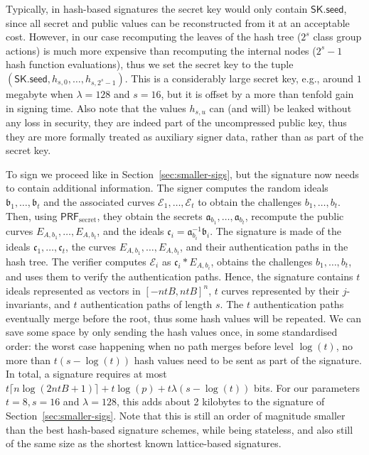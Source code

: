 \documentclass{llncs}
\newcommand{\E}{\mathcal{E}}
\newcommand{\seed}{\mathsf{seed}}
\newcommand{\SK}{\mathsf{SK}}
\renewcommand{\a}{\mathfrak{a}}
\renewcommand{\b}{\mathfrak{b}}
\renewcommand{\c}{\mathfrak{c}}
\newcommand{\PRF}{\mathsf{PRF}}
\newcommand{\PRFs}{\PRF_{\mathrm{secret}}}
\begin{document}
Typically, in hash-based signatures the secret key would only contain $\SK.\seed$, since all secret and public values can be reconstructed from it at an acceptable cost.
However, in our case recomputing the leaves of the hash tree ($2^s$ class group actions) is much more expensive than recomputing the internal nodes ($2^s-1$ hash function evaluations), thus we set the secret key to the tuple $(\SK.\seed,h_{s,0},\dots,h_{s,2^s-1})$.
This is a considerably large secret key, e.g., around $1$ megabyte when $\lambda=128$ and $s=16$, but it is offset by a more than tenfold gain in signing time.
Also note that the values $h_{s,u}$ can (and will) be leaked without any loss in security, they are indeed part of the uncompressed public key, thus they are more formally treated as auxiliary signer data, rather than as part of the secret key.

To sign we proceed like in Section~\ref{sec:smaller-sigs}, but the signature now needs to contain additional information.
The signer computes the random ideals $\b_1,\dots,\b_t$ and the associated curves $\E_1,\dots,\E_t$ to obtain the challenges $b_1,\dots,b_t$.
Then, using $\PRFs$, they obtain the secrets $\a_{b_1},\dots,\a_{b_t}$, recompute the public curves $E_{A,b_1},\dots,E_{A,b_t}$, and the ideals $\c_i=\a_{b_i}^{-1}\b_i$.
The signature is made of the ideals $\c_1,\dots,\c_t$, the curves $E_{A,b_1},\dots,E_{A,b_t}$, and their authentication paths in the hash tree.
The verifier computes $\E_i$ as $\c_i * E_{A,b_i}$, obtains the challenges $b_1,\dots,b_t$, and uses them to verify the authentication paths.
Hence, the signature contains $t$ ideals represented as vectors in $[-ntB,ntB]^n$, $t$ curves represented by their $j$-invariants, and $t$ authentication paths of length $s$.
The $t$ authentication paths eventually merge before the root, thus some hash values will be repeated.
We can save some space by only sending the hash values once, in some standardised order: the worst case happening when no path merges before level $\log(t)$, no more than $t(s-\log(t))$ hash values need to be sent as part of the signature.
In total, a signature requires at most $t\lceil n \log(2ntB+1)\rceil + t\log(p) + t\lambda(s-\log(t))$ bits.
For our parameters $t=8, s=16$ and $\lambda=128$, this adds about 2 kilobytes to the signature of Section~\ref{sec:smaller-sigs}.
Note that this is still an order of magnitude smaller than the best hash-based signature schemes, while being stateless, and also still of the same size as the shortest known lattice-based signatures.
\end{document}
